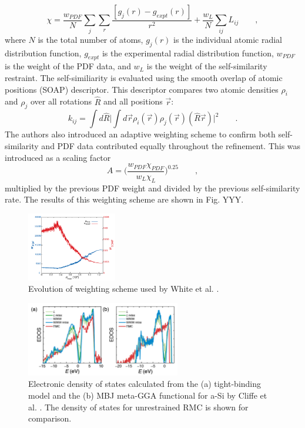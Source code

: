 \documentclass[3p,review,12pt]{elsarticle}
\begin{document}
\begin{equation}
\chi = \frac{w_{PDF}}{N}\sum_{j}\sum_{r} \frac{[g_{j}(r)-g_{expt}(r)]}{r^{2}}+\frac{w_{L}}{N}\sum_{ij}L_{ij} \qquad ,
\end{equation}
where $N$ is the total number of atoms, $g_{j}(r)$ is the individual atomic radial distribution function, $g_{expt}$ is the experimental radial distribution function, $w_{PDF}$ is the weight of the PDF data, and $w_{L}$ is the weight of the self-similarity restraint. The self-similiarity is evaluated using the smooth overlap of atomic positions (SOAP) descriptor. This descriptor compares two atomic densities $\rho_{i}$ and $\rho_{j}$ over all rotations $\hat{R}$ and all positions $\vec{r}$:
\begin{equation}
k_{ij} = \int d \hat{R} \Bigg|\int d\vec{r}\rho_{i}(\vec{r})\rho_{j}(\vec{r})(\hat{R}\vec{r})\Bigg|^{2} \qquad .
\end{equation}
The authors also introduced an adaptive weighting scheme to confirm both self-similarity and PDF data contributed equally throughout the refinement. This was introduced as a scaling factor
\begin{equation}
A=\bigg(\frac{w_{PDF}\chi_{PDF}}{w_{L}\chi_{L}}\bigg)^{0.25} \qquad ,
\end{equation}
multiplied by the previous PDF weight and divided by the previous self-similarity rate. The results of this weighting scheme are shown in Fig. YYY. 

\begin{figure}[H]
	\includegraphics[width=0.35\textwidth]{white1}
	\centering
	\caption{Evolution of weighting scheme used by White et al. \cite{White2014}.}
\end{figure}

\begin{figure}[H]
	\includegraphics[width=0.6\textwidth]{white2}
	\centering
	\caption{Electronic density of states calculated from the (a) tight-binding model and the (b) MBJ meta-GGA functional for a-Si by Cliffe et al. \cite{Cliffe2017}. The density of states for unrestrained RMC is shown for comparison.}
\end{figure}
\end{document}
